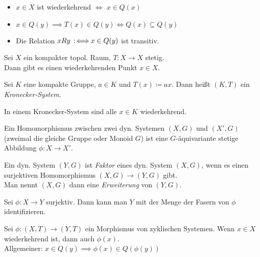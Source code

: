 \documentclass{cheat-sheet}
\begin{document}
\begin{lem}
  \begin{itemize}
    \item $x \in X$ ist wiederkehrend $\iff$ $x \in Q(x)$
    \item $x \in Q(y) \implies T(x) \in Q(y) \iff Q(x) \subseteq Q(y)$
    \item Die Relation $xRy \!\!\enspace:\!\iff\!\! x \in Q(y)$ ist transitiv.
  \end{itemize}
\end{lem}

\begin{thm}
  Sei $X$ ein kompakter topol. Raum, $T : X \to X$ stetig. \\
  Dann gibt es einen wiederkehrenden Punkt $x \in X$.
\end{thm}

\begin{defn}
  Sei $K$ eine kompakte Gruppe, $a \in K$ und $T(x) \coloneqq ax$. Dann heißt $(K, T)$ ein \emph{Kronecker-System}.
\end{defn}

\begin{thm}
  In einem Kronecker-System sind alle $x \in K$ wiederkehrend.
\end{thm}


\begin{defn}
  Ein Homomorphismus zwischen zwei dyn. Systemen $(X, G)$ und $(X', G)$ (zweimal die gleiche Gruppe oder Monoid $G$) ist eine $G$-äquivariante stetige Abbildung $\phi : X \to X'$.
\end{defn}

\begin{defn}
  Ein dyn. System $(Y, G)$ ist \emph{Faktor} eines dyn. System $(X, G)$, wenn es einen surjektiven Homomorphismus $(X, G) \to (Y, G)$ gibt. \\
  Man nennt $(X, G)$ dann eine \emph{Erweiterung} von $(Y, G)$.
\end{defn}

\begin{bem}
  Sei $\phi : X \to Y$ surjektiv. Dann kann man $Y$ mit der Menge der Fasern von $\phi$ identifizieren.
\end{bem}

\begin{thm}
  Sei $\phi : (X, T) \to (Y, T)$ ein Morphismus von zyklischen Systemen.
  Wenn $x \in X$ wiederkehrend ist, dann auch $\phi(x)$. \\
  Allgemeiner: $x \in Q(y) \implies \phi(x) \in Q(\phi(y))$
\end{thm}
\end{document}
